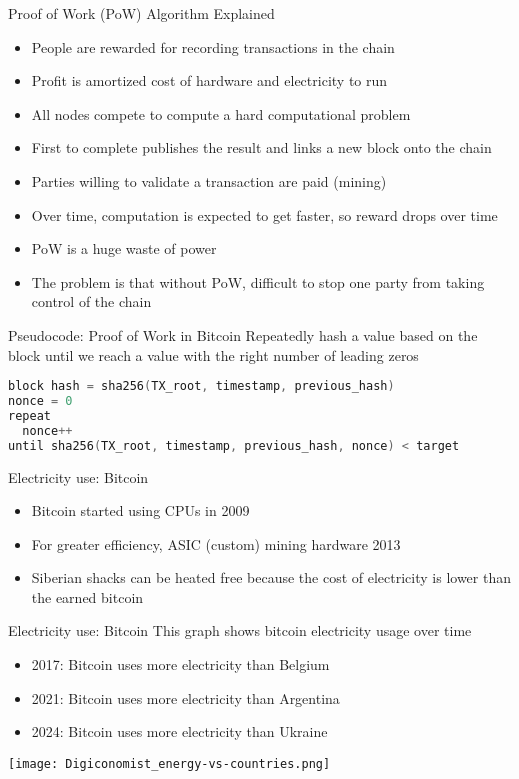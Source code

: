 \begin{withoutheadline}
\begin{frame}{Proof of Work (PoW) Algorithm Explained}
    \begin{itemize}
        \item People are rewarded for recording transactions in the chain
        \item Profit is amortized cost of hardware and electricity to run
        \item All nodes compete to compute a hard computational problem
        \item First to complete publishes the result and links a new block onto the chain
        \item Parties willing to validate a transaction are paid (mining)
        \item Over time, computation is expected to get faster, so reward drops over time
        \item PoW is a huge waste of power
        \item The problem is that without PoW, difficult to stop one party from taking control of the chain
    \end{itemize}
\end{frame}

\begin{frame}[fragile]{Pseudocode: Proof of Work in Bitcoin}
    Repeatedly hash a value based on the block until we reach a value with the right number of leading zeros
\begin{lstlisting}[language=c++]
block hash = sha256(TX_root, timestamp, previous_hash)
nonce = 0
repeat
  nonce++
until sha256(TX_root, timestamp, previous_hash, nonce) < target
\end{lstlisting}
\end{frame}

\begin{frame}{Electricity use: Bitcoin}
    \begin{itemize}
        \item Bitcoin started using CPUs in 2009
        \item For greater efficiency, ASIC (custom) mining hardware 2013
        \item Siberian shacks can be heated free because the cost of electricity is lower than the earned bitcoin
    \end{itemize}
\end{frame}

\begin{frame}{Electricity use: Bitcoin}
This graph shows bitcoin electricity usage over time
\begin{itemize}
    \item 2017: Bitcoin uses more electricity than Belgium
    \item 2021: Bitcoin uses more electricity than Argentina
    \item 2024: Bitcoin uses more electricity than Ukraine
\end{itemize} 
\texttt{[image: Digiconomist\_energy-vs-countries.png]}
\end{frame}



\end{withoutheadline}
